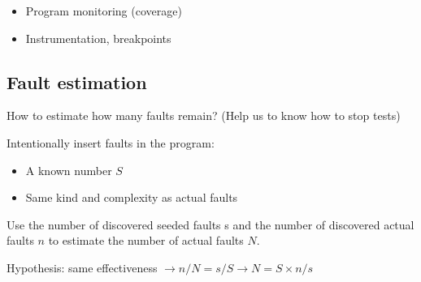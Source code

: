 \begin{itemize}
    \item Program monitoring (coverage)
    \item Instrumentation, breakpoints
\end{itemize}

\subsection{Fault estimation}

How to estimate how many faults remain? (Help us to know how to stop tests) \newline

Intentionally insert faults in the program:

\begin{itemize}
    \item A known number $S$
    \item Same kind and complexity as actual faults
\end{itemize}

Use the number of discovered seeded faults s and the number of discovered actual faults $n$ to estimate the number of actual faults $N$.\newline

Hypothesis: same effectiveness $\rightarrow n / N = s / S \rightarrow N = S \times n / s$

